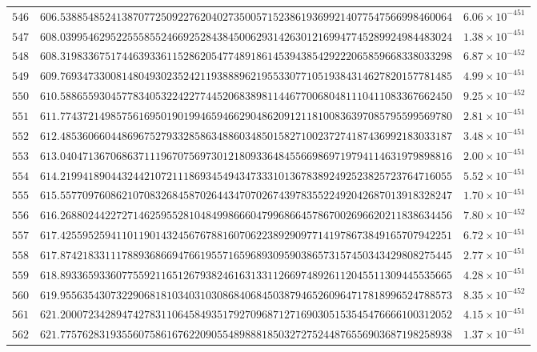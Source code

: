 \documentclass[12pt,reqno]{amsart}
\theoremstyle{remark}
\begin{document}
\begin{longtable}{clc}
$546$ & $606.5388548524138707725092276204027350057152386193699214077547566998460064$ & $6.06\times 10^{-451}$ \\
$547$ & $608.0399546295225558552466925284384500629314263012169947745289924984483024$ & $1.38\times 10^{-451}$ \\
$548$ & $608.3198336751744639336115286205477489186145394385429222065859668338033298$ & $6.87\times 10^{-452}$ \\
$549$ & $609.7693473300814804930235242119388896219553307710519384314627820157781485$ & $4.99\times 10^{-451}$ \\
$550$ & $610.5886559304577834053224227744520683898114467700680481110411083367662450$ & $9.25\times 10^{-452}$ \\
$551$ & $611.7743721498575616950190199465946629048620912118100836397085795599569780$ & $2.81\times 10^{-451}$ \\
$552$ & $612.4853606604486967527933285863488603485015827100237274187436992183033187$ & $3.48\times 10^{-451}$ \\
$553$ & $613.0404713670686371119670756973012180933648455669869719794114631979898816$ & $2.00\times 10^{-451}$ \\
$554$ & $614.2199418904432442107211186934549434733310136783892492523825723764716055$ & $5.52\times 10^{-451}$ \\
$555$ & $615.5577097608621070832684587026443470702674397835522492042687013918328247$ & $1.70\times 10^{-451}$ \\
$556$ & $616.2688024422727146259552810484998666047996866457867002696620211838634456$ & $7.80\times 10^{-452}$ \\
$557$ & $617.4255952594110119014324567678816070622389290977141978673849165707942251$ & $6.72\times 10^{-451}$ \\
$558$ & $617.8742183311178893686694766195571659689309590386573157450343429808275445$ & $2.77\times 10^{-451}$ \\
$559$ & $618.8933659336077559211651267938246163133112669748926112045511309445535665$ & $4.28\times 10^{-451}$ \\
$560$ & $619.9556354307322906818103403103086840684503879465260964717818996524788573$ & $8.35\times 10^{-452}$ \\
$561$ & $621.2000723428947427831106458493517927096871271690305153545476666100312052$ & $4.15\times 10^{-451}$ \\
$562$ & $621.7757628319355607586167622090554898881850327275244876556903687198258938$ & $1.37\times 10^{-451}$ \\

\end{longtable}
\end{document}
